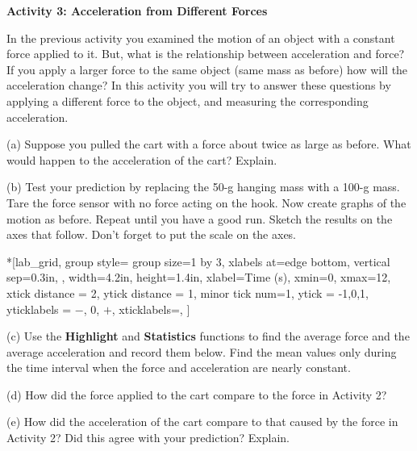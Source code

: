 \textbf{Activity 3: Acceleration from Different Forces }

In the previous activity you examined the motion of an object with a constant
force applied to it. But, what is the relationship between acceleration and
force? If you apply a larger force to the same object (same mass as before) how
will the acceleration change? In this activity you will try to answer these
questions by applying a different force to the object, and measuring the corresponding
acceleration. 

(a) Suppose you pulled the cart with a force about twice as large as before.
What would happen to the acceleration of the cart? Explain.
\answerspace{20mm}

\pagebreak[3]
(b) Test your prediction by replacing the 50-g hanging mass with a 100-g mass. Tare the force sensor with no force acting on the hook. Now create graphs of the motion as before.  Repeat until you have a good run. Sketch the results on the axes that follow. Don't forget to put the scale on the axes.

\begin{lab_groupplot}*{}[lab_grid,
	group style={
		group size=1 by 3,
		xlabels at=edge bottom,
		vertical sep=0.3in,
		},
	width=4.2in,  height=1.4in,
	xlabel=Time (s),
	xmin=0, xmax=12,
	xtick distance = 2, 
	ytick distance = 1, 
	minor tick num=1,
	ytick = {-1,0,1},
	yticklabels = {$-$, 0, $+$},
	xticklabels=\empty,
	]
\nextgroupplot[
	ymin=-1,ymax=1, 
	ylabel={Velocity (m/s)},
	]
\nextgroupplot[
	ymin=-1,ymax=1, 
	ylabel={Acceleration (m/s$^2$)},
	]
\nextgroupplot[
	ymin=-1,ymax=1, 
	ylabel={Force (N)},
	]
\end{lab_groupplot}


(c) Use the \textbf{Highlight} and  \textbf{Statistics} functions to find the 
average force and the average acceleration and record them below. Find the mean values only during the time interval when the force and acceleration are nearly constant.
\answerspace{20mm}

(d) How did the force applied to the cart compare to the force in Activity 2?
\answerspace{20mm}

(e) How did the acceleration of the cart compare to that caused by the force in Activity 2? Did this agree with your prediction? Explain.
\answerspace{20mm}

